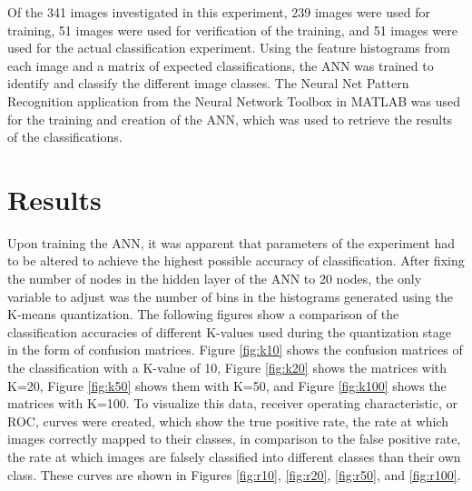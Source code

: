 \documentclass{article}
\begin{document}
Of the 341 images investigated in this experiment, 239 images were used for training, 51 images were used for verification of the training, and 51 images were used for the actual classification experiment. Using the feature histograms from each image and a matrix of expected classifications, the ANN was trained to identify and classify the different image classes. The Neural Net Pattern Recognition application from the Neural Network Toolbox in MATLAB was used for the training and creation of the ANN, which was used to retrieve the results of the classifications.

%
\section{Results}
\label{sec:results}
Upon training the ANN, it was apparent that parameters of the experiment had to be altered to achieve the highest possible accuracy of classification. After fixing the number of nodes in the hidden layer of the ANN to 20 nodes, the only variable to adjust was the number of bins in the histograms generated using the K-means quantization. The following figures show a comparison of the classification accuracies of different K-values used during the quantization stage in the form of confusion matrices. Figure \ref{fig:k10} shows the confusion matrices of the classification with a K-value of 10, Figure \ref{fig:k20} shows the matrices with K=20, Figure \ref{fig:k50} shows them with K=50, and Figure \ref{fig:k100} shows the matrices with K=100. To visualize this data, receiver operating characteristic, or ROC, curves were created, which show the true positive rate, the rate at which images correctly mapped to their classes, in comparison to the false positive rate, the rate at which images are falsely classified into different classes than their own class. These curves are shown in Figures \ref{fig:r10}, \ref{fig:r20}, \ref{fig:r50}, and \ref{fig:r100}.
%
\end{document}
